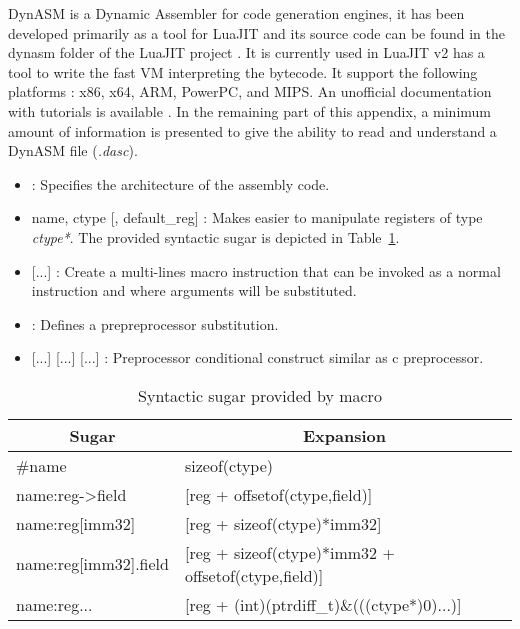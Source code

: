 DynASM is a Dynamic Assembler for code generation engines, it has been developed
primarily as a tool for LuaJIT and its source code can be found in the dynasm
folder of the LuaJIT project \cite{luajit-src}. It is currently used in LuaJIT
v2 has a tool to write the fast VM interpreting the bytecode. It support the
following platforms : x86, x64, ARM, PowerPC, and MIPS. An unofficial
documentation with tutorials is available \cite{dynasm}. In the remaining part
of this appendix, a minimum amount of information is presented to give the
ability to read and understand a DynASM file (\emph{.dasc}).



\begin{itemize}
    \item {} : Specifies the architecture of the assembly code.
    \item {} name, ctype [, default\_reg] : Makes easier to manipulate registers of type \emph{ctype*}. The provided syntactic sugar is depicted in
Table~\ref{tab:type-sugar}.
    \item {} [...]  : Create a multi-lines
macro instruction that can be invoked as a normal instruction and where arguments
will be substituted.
    \item {} : Defines a prepreprocessor substitution.
    \item {} [...]  [...]  [...]  : Preprocessor conditional construct similar as c preprocessor.
\end{itemize}

\begin{table}
\centering
\begin{tabular}{|l|l|}
\hline
\multicolumn{1}{|c|}{Sugar} & \multicolumn{1}{c|}{Expansion} \\\hline
\#name                      & sizeof(ctype)\\
name:reg-\textgreater field & [reg + offsetof(ctype,field)]\\
name:reg[imm32]             & [reg + sizeof(ctype)*imm32]\\
name:reg[imm32].field       & [reg + sizeof(ctype)*imm32 + offsetof(ctype,field)]\\
name:reg...                 & [reg + (int)(ptrdiff\_t)\&(((ctype*)0)...)]\\\hline
\end{tabular}
\caption{Syntactic sugar provided by  macro}
\label{tab:type-sugar}
\end{table}

